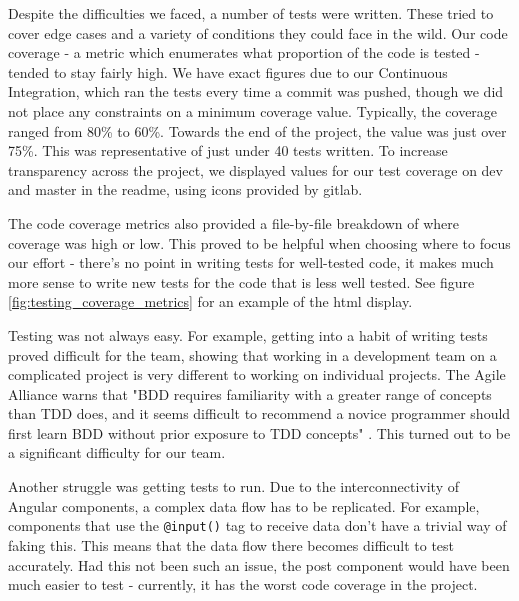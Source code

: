 \documentclass{l3proj}
\begin{document}
Despite the difficulties we faced, a number of tests were written. These
 tried to cover edge cases and a variety of conditions they could face in
 the wild. Our code coverage - a metric which enumerates what proportion of
 the code is tested - tended to stay fairly high. We have exact figures due
 to our Continuous Integration, which ran the tests every time a commit was
 pushed, though we did not place any constraints on a minimum coverage value.
 Typically, the coverage ranged from 80\% to 60\%. Towards the end of the
 project, the value was just over 75\%. This was representative of just under 40
 tests written. To increase transparency across the project, we displayed values
 for our test coverage on dev and master in the readme, using icons provided by gitlab.

 The code coverage metrics also provided a file-by-file breakdown of where
 coverage was high or low. This proved to be helpful when choosing
 where to focus our effort - there's no point in writing tests for
 well-tested code, it makes much more sense to write new tests for the
 code that is less well tested. See figure \ref{fig:testing_coverage_metrics}
 for an example of the html display.

Testing was not always easy. For example, getting into a habit of writing tests
 proved difficult for the team, showing that working in a development team on a
 complicated project is very different to working on individual projects. The
 Agile Alliance warns that "BDD requires familiarity with a greater range of
 concepts than TDD does, and it seems difficult to recommend a novice programmer
 should first learn BDD without prior exposure to TDD concepts"
 \cite{agilealliance_bdd}. This turned out to be a significant difficulty for
 our team.

Another struggle was getting tests to run. Due to the interconnectivity of
 Angular components, a complex data flow has to be replicated. For example,
 components that use the \texttt{@input()} tag to receive data don't have a
 trivial way of faking this. This means that the data flow there becomes
 difficult to test accurately. Had this not been such an issue, the post
 component would have been much easier to test - currently, it has the worst
 code coverage in the project.
\end{document}
